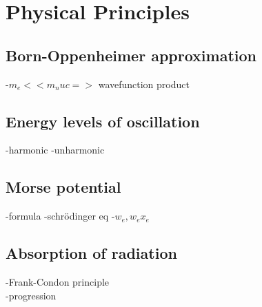 \section{Physical Principles}
\subsection{Born-Oppenheimer approximation}
-$m_e << m_nuc =>$ wavefunction product

\subsection{Energy levels of oscillation}
-harmonic
-unharmonic

\subsection{Morse potential}
-formula
-schrödinger eq
-$w_e, w_e x_e$

\subsection{Absorption of radiation}
-Frank-Condon principle \\
-progression